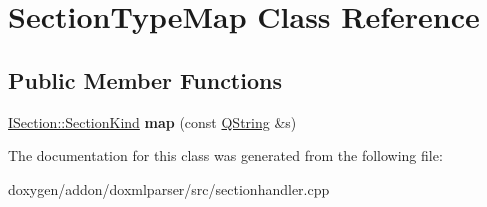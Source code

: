 \hypertarget{class_section_type_map}{}\section{Section\+Type\+Map Class Reference}
\label{class_section_type_map}
\subsection*{Public Member Functions}
\begin{DoxyCompactItemize}
\item 
\mbox{\label{class_section_type_map_a0d8cbb4ddfa568acef08bf50472aa91c}} 
\mbox{\hyperlink{class_i_section_af768cbfe7056fadbd0a67d26d0ef84e5}{I\+Section\+::\+Section\+Kind}} {\bfseries map} (const \mbox{\hyperlink{class_q_string}{Q\+String}} \&s)
\end{DoxyCompactItemize}


The documentation for this class was generated from the following file\+:\begin{DoxyCompactItemize}
\item 
doxygen/addon/doxmlparser/src/sectionhandler.\+cpp\end{DoxyCompactItemize}

